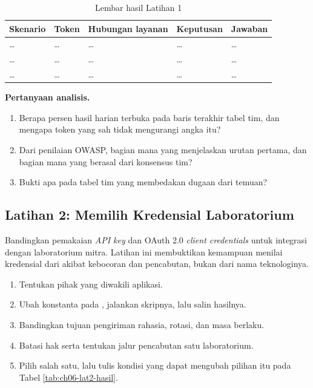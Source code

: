 \begin{table}[!htb]
  \centering
  \caption{Lembar hasil Latihan 1}
  \label{tab:ch06-lat1-hasil}
  \small
  \begin{tabularx}{\textwidth}{QT{2.1cm}T{1.7cm}T{2.2cm}T{1.4cm}}
    \hline
    \textbf{Skenario} & \textbf{Token} & \textbf{Hubungan layanan} & \textbf{Keputusan} & \textbf{Jawaban} \\ \hline
    \dots & \dots & \dots & \dots & \dots \\ \hline
    \dots & \dots & \dots & \dots & \dots \\ \hline
    \dots & \dots & \dots & \dots & \dots \\ \hline
  \end{tabularx}
\end{table}

\textbf{Pertanyaan analisis.}
\begin{enumerate}
  \item Berapa persen hasil harian terbuka pada baris terakhir tabel tim, dan mengapa token yang sah tidak mengurangi angka itu?
  \item Dari penilaian OWASP, bagian mana yang menjelaskan urutan pertama, dan bagian mana yang berasal dari konsensus tim?
  \item Bukti apa pada tabel tim yang membedakan dugaan dari temuan?
\end{enumerate}

\subsection*{Latihan 2: Memilih Kredensial Laboratorium}

Bandingkan pemakaian \textit{API key} dan OAuth 2.0 \textit{client credentials} untuk integrasi dengan laboratorium mitra. Latihan ini membuktikan kemampuan menilai
kredensial dari akibat kebocoran dan pencabutan, bukan dari nama teknologinya.

\begin{enumerate}
  \item Tentukan pihak yang diwakili aplikasi.
  \item Ubah konstanta pada , jalankan skripnya, lalu salin hasilnya.
  \item Bandingkan tujuan pengiriman rahasia, rotasi, dan masa berlaku.
  \item Batasi hak serta tentukan jalur pencabutan satu laboratorium.
  \item Pilih salah satu, lalu tulis kondisi yang dapat mengubah pilihan itu pada Tabel \ref{tab:ch06-lat2-hasil}.
\end{enumerate}

